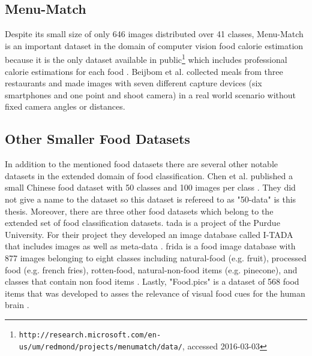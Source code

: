 \subsection{Menu-Match}
\label{subsec:relWork_Datasets_menuMatch}
Despite its small size of only 646 images distributed over 41 classes, Menu-Match is an important dataset in the domain of computer vision food calorie estimation because it is the only dataset available in public\footnote{\texttt{http://research.microsoft.com/en-us/um/redmond/projects/menumatch/data/}, accessed 2016-03-03} which includes professional calorie estimations for each food \cite{Beijbom2015}. Beijbom et al. collected meals from three restaurants and made images with seven different capture devices {(six smartphones and one point and shoot camera)} in a real world scenario without fixed camera angles or distances.

\subsection{Other Smaller Food Datasets}
In addition to the mentioned food datasets there are several other notable datasets in the extended domain of food classification. Chen et al. published a small Chinese food dataset with 50 classes and 100 images per class \cite{Chen2012}. They did not give a name to the dataset so this dataset is refereed to as "50-data" is this thesis. Moreover, there are three other food datasets which belong to the extended set of food classification datasets. 
\newline\newline
\gls{tada} is a project of the Purdue University. For their project they developed an image database called I-TADA that includes images as well as meta-data \cite{Khanna2010}.
\newline\newline
\gls{frida} is a food image database with 877 images belonging to eight classes including natural-food {(e.g. fruit)}, processed food {(e.g. french fries)}, rotten-food, natural-non-food items {(e.g. pinecone)}, and classes that contain non food items \cite{Foroni2013}.
\newline\newline
Lastly, "Food.pics" is a dataset of 568 food items that was developed to asses the relevance of visual food cues for the human brain \cite{Blechert2014}. 

